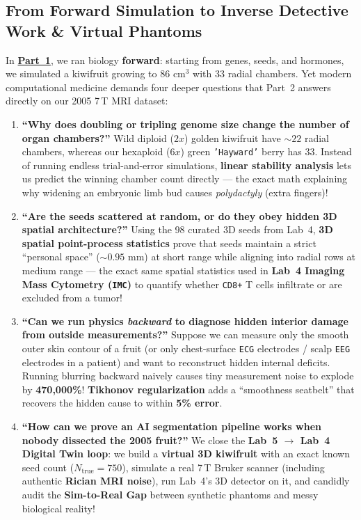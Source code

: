 \documentclass[10.5pt,a4paper]{article}
\begin{document}
\subsection{From Forward Simulation to Inverse Detective Work \& Virtual Phantoms}

In \href{https://github.com/arvidl/BMED365-2027/blob/main/Lab5-Comp-Mod/Kiwi-challenge/docs/foundations-atlas-and-morphogenesis.pdf}{\textbf{Part~1}}, we ran biology \textbf{forward}: starting from genes, seeds, and hormones, we simulated a kiwifruit growing to $86\text{ cm}^3$ with 33 radial chambers. Yet modern computational medicine demands four deeper questions that Part~2 answers directly on our 2005 7\,T MRI dataset:

\begin{enumerate}
    \item \textbf{``Why does doubling or tripling genome size change the number of organ chambers?''} Wild diploid ($2x$) golden kiwifruit have $\sim 22$ radial chambers, whereas our hexaploid ($6x$) green \texttt{'Hayward'} berry has $33$. Instead of running endless trial-and-error simulations, \textbf{linear stability analysis} lets us predict the winning chamber count directly --- the exact math explaining why widening an embryonic limb bud causes \emph{polydactyly} (extra fingers)!
    \item \textbf{``Are the seeds scattered at random, or do they obey hidden 3D spatial architecture?''} Using the 98 curated 3D seeds from Lab~4, \textbf{3D spatial point-process statistics} prove that seeds maintain a strict ``personal space'' ($\sim 0.95\text{ mm}$) at short range while aligning into radial rows at medium range --- the exact same spatial statistics used in \textbf{Lab~4 Imaging Mass Cytometry (\texttt{IMC})} to quantify whether \texttt{CD8+} T cells infiltrate or are excluded from a tumor!
    \item \textbf{``Can we run physics \emph{backward} to diagnose hidden interior damage from outside measurements?''} Suppose we can measure only the smooth outer skin contour of a fruit (or only chest-surface \texttt{ECG} electrodes / scalp \texttt{EEG} electrodes in a patient) and want to reconstruct hidden internal deficits. Running blurring backward naively causes tiny measurement noise to explode by \textbf{470,000\%}! \textbf{Tikhonov regularization} adds a ``smoothness seatbelt'' that recovers the hidden cause to within \textbf{5\% error}.
    \item \textbf{``How can we prove an AI segmentation pipeline works when nobody dissected the 2005 fruit?''} We close the \textbf{Lab~5 $\to$ Lab~4 Digital Twin loop}: we build a \textbf{virtual 3D kiwifruit} with an exact known seed count ($N_{\text{true}} = 750$), simulate a real 7\,T Bruker scanner (including authentic \textbf{Rician MRI noise}), run Lab~4's 3D detector on it, and candidly audit the \textbf{Sim-to-Real Gap} between synthetic phantoms and messy biological reality!
\end{enumerate}
\end{document}
